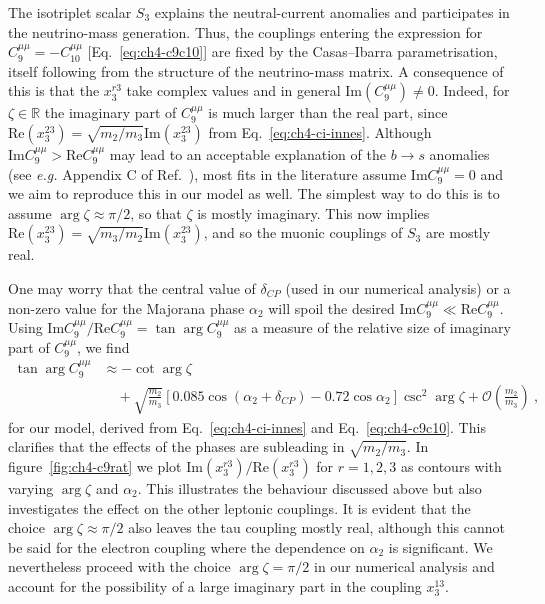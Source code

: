 The isotriplet scalar $S_{3}$ explains the neutral-current anomalies and
participates in the neutrino-mass generation. Thus, the couplings entering the
expression for $C^{\mu\mu}_{9} = - C^{\mu\mu}_{10}$ [Eq.~\eqref{eq:ch4-c9c10}]
are fixed by the Casas--Ibarra parametrisation, itself following from the
structure of the neutrino-mass matrix. A consequence of this is that the
$x^{r3}_{3}$ take complex values and in general
$\text{Im}(C^{\mu\mu}_{9}) \neq 0$. Indeed, for $\zeta \in \mathbb{R}$ the
imaginary part of $C^{\mu\mu}_{9}$ is much larger than the real part, since
$\text{Re}(x^{23}_{3}) = \sqrt{m_{2}/m_{3}} \text{Im}(x^{23}_{3})$ from
Eq.~\eqref{eq:ch4-ci-innes}. Although
$\text{Im} C^{\mu\mu}_{9} > \text{Re} C^{\mu\mu}_{9}$ may lead to an acceptable
explanation of the $b \to s$ anomalies (see \textit{e.g.} Appendix C of
Ref.~\cite{Altmannshofer:2014rta}), most fits in the literature assume
$\text{Im} C^{\mu\mu}_{9} = 0$ and we aim to reproduce this in our model as
well. The simplest way to do this is to assume $\arg \zeta \approx \pi / 2$, so
that $\zeta$ is mostly imaginary. This now implies
$\text{Re}(x^{23}_{3}) = \sqrt{m_{3}/m_{2}} \text{Im}(x^{23}_{3})$, and so the
muonic couplings of $S_{3}$ are mostly real.

One may worry that the central value of $\delta_{CP}$ (used in our numerical
analysis) or a non-zero value for the Majorana phase $\alpha_{2}$ will spoil the
desired $\text{Im} C^{\mu\mu}_{9} \ll \text{Re} C^{\mu\mu}_{9}$. Using
$\text{Im}C^{\mu\mu}_{9} / \text{Re}C^{\mu\mu}_{9} = \tan \arg C_{9}^{\mu\mu}$ as a
measure of the relative size of imaginary part of $C_{9}^{\mu\mu}$, we find
\begin{equation}
  \label{eq:ch4-c9rat}
  \begin{split}
    \tan \arg C_{9}^{\mu\mu} &\approx - \cot \arg \zeta\\
    &\quad + \sqrt{\frac{m_{2}}{m_{3}}}[0.085 \cos (\alpha_{2} + \delta_{CP}) - 0.72 \cos\alpha_{2}] \csc^{2}\arg \zeta+ \mathcal{O}\left(\frac{m_{2}}{m_{3}}\right) \ ,
  \end{split}
\end{equation}
for our model, derived from Eq.~\eqref{eq:ch4-ci-innes} and
Eq.~\eqref{eq:ch4-c9c10}. This clarifies that the effects of the phases are
subleading in $\sqrt{m_{2} / m_{3}}$. In figure~\ref{fig:ch4-c9rat} we plot
$\text{Im}(x_{3}^{r3}) / \text{Re}(x_{3}^{r3})$ for $r = 1, 2, 3$ as contours
with varying $\arg \zeta$ and $\alpha_{2}$. This illustrates the behaviour
discussed above but also investigates the effect on the other leptonic
couplings. It is evident that the choice $\arg \zeta \approx \pi/2$ also leaves
the tau coupling mostly real, although this cannot be said for the electron
coupling where the dependence on $\alpha_{2}$ is significant. We nevertheless
proceed with the choice $\arg \zeta = \pi / 2$ in our numerical analysis and
account for the possibility of a large imaginary part in the coupling
$x^{13}_{3}$.

